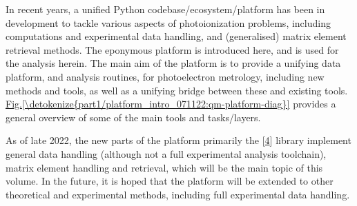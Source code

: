 \documentclass[letterpaper,table,10pt,english]{jupyterBook}
\begin{document}
\sphinxAtStartPar
In recent years, a unified Python codebase/ecosystem/platform has been in development to tackle various aspects of photoionization problems, including  computations and experimental data handling, and (generalised) matrix element retrieval methods. The eponymous  platform is introduced here, and is used for the analysis herein. The main aim of the platform is to provide a unifying data platform, and analysis routines, for photoelectron metrology, including new methods and tools, as well as a unifying bridge between these and existing tools. \hyperref[\detokenize{part1/platform_intro_071122:qm-platform-diag}]{Fig.\@ \ref{\detokenize{part1/platform_intro_071122:qm-platform-diag}}} provides a general overview of some of the main tools and tasks/layers.

\sphinxAtStartPar
As of late 2022, the new parts of the platform \sphinxhyphen{} primarily the  {[}\hyperlink{cite.backmatter/bibliography:id574}{4}{]} library \sphinxhyphen{} implement general data handling (although not a full experimental analysis toolchain), matrix element handling and retrieval, which will be the main topic of this volume.
In the future, it is hoped that the platform will be extended to other theoretical and experimental methods, including full experimental data handling.
\end{document}
